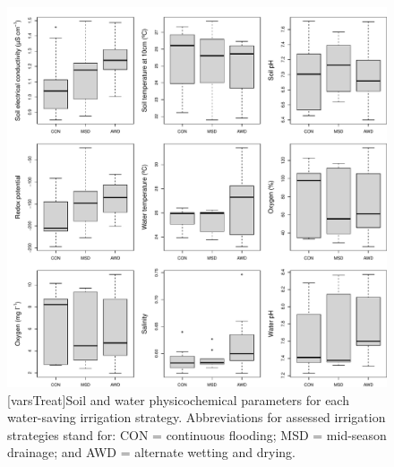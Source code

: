 
\begin{figure}[htbp]
\captionsetup{justification=justified}
	\centering 
	\includegraphics[scale=0.6, center]{Figures/Chapter_1/Ind_vars_Treat_inter.pdf}
	[varsTreat]{Soil and water physicochemical parameters for each water-saving irrigation strategy. Abbreviations for assessed irrigation strategies stand for: CON = continuous flooding; MSD = mid-season drainage; and AWD = alternate wetting and drying.}  
 \label{vars_Treat}
\end{figure} 

\setcounter{table}{0}
\renewcommand{\thetable}{A.\arabic{table}} %

